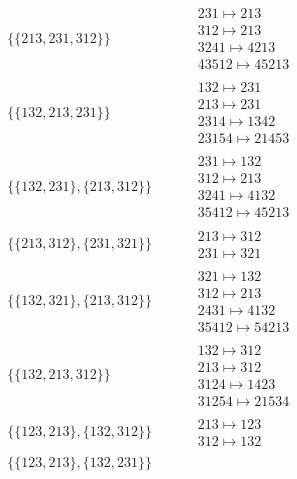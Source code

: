 \begin{tiny}
\begin{align}
\{\{213, 231, 312\}\}
\quad
&
\phantom{.}
&
\begin{matrix}
231 \mapsto 213\\312 \mapsto 213\\3241 \mapsto 4213\\43512 \mapsto 45213
\end{matrix}
\\
\{\{132, 213, 231\}\}
\quad
&
\phantom{.}
&
\begin{matrix}
132 \mapsto 231\\213 \mapsto 231\\2314 \mapsto 1342\\23154 \mapsto 21453
\end{matrix}
\\
\{\{132, 231\}, \{213, 312\}\}
\quad
&
\phantom{.}
&
\begin{matrix}
231 \mapsto 132\\312 \mapsto 213\\3241 \mapsto 4132\\35412 \mapsto 45213
\end{matrix}
\\
\{\{213, 312\}, \{231, 321\}\}
\quad
&
\phantom{.}
&
\begin{matrix}
213 \mapsto 312\\231 \mapsto 321
\end{matrix}
\\
\{\{132, 321\}, \{213, 312\}\}
\quad
&
\phantom{.}
&
\begin{matrix}
321 \mapsto 132\\312 \mapsto 213\\2431 \mapsto 4132\\35412 \mapsto 54213
\end{matrix}
\\
\{\{132, 213, 312\}\}
\quad
&
\phantom{.}
&
\begin{matrix}
132 \mapsto 312\\213 \mapsto 312\\3124 \mapsto 1423\\31254 \mapsto 21534
\end{matrix}
\\
\{\{123, 213\}, \{132, 312\}\}
\quad
&
\phantom{.}
&
\begin{matrix}
213 \mapsto 123\\312 \mapsto 132
\end{matrix}
\\
\{\{123, 213\}, \{132, 231\}\}
\quad
&
\phantom{.}
&
\begin{matrix}

\end{matrix}
\end{align}
\end{tiny}

